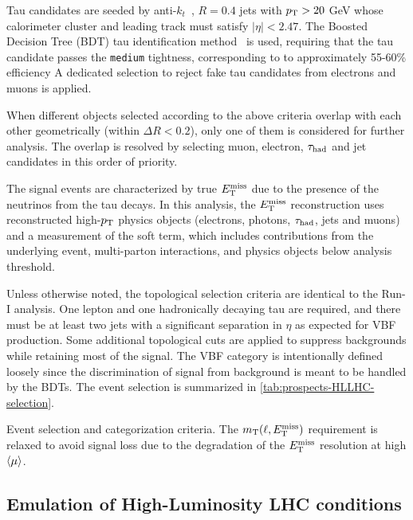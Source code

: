 Tau candidates are seeded by anti-$k_t$~\cite{2008.antikt}, $R=0.4$ jets with $p_{\mathrm{T}} > 20$ GeV whose calorimeter cluster and leading track must satisfy $|\eta| < 2.47$. The Boosted Decision Tree (BDT) tau identification method~\cite{PERF-2013-06} is used, requiring that the tau candidate passes the \texttt{medium} tightness, corresponding to to approximately 55-60\% efficiency A dedicated selection to reject fake tau candidates from electrons and muons is applied.

When different objects selected according to the above criteria overlap with each other geometrically (within $\Delta R < 0.2$), only one of them is considered for further analysis. The overlap is resolved by selecting muon, electron, $\tau_\text{had}$ and jet candidates in this order of priority.

The signal events are characterized by true $E_{\mathrm{T}}^{\mathrm{miss}}$ due to the presence of the neutrinos from the tau decays. In this analysis, the $E_{\mathrm{T}}^{\mathrm{miss}}$ reconstruction uses reconstructed high-$p_{\mathrm{T}}$ physics objects (electrons, photons, $\tau_\text{had}$, jets and muons) and a measurement of the soft term, which includes contributions from the underlying event, multi-parton interactions, and physics objects below analysis threshold.

Unless otherwise noted, the topological selection criteria are identical to the Run-I analysis. One lepton and one hadronically decaying tau are required, and there must be at least two jets with a significant separation in $\eta$ as expected for VBF production. Some additional topological cuts are applied to suppress backgrounds while retaining most of the signal. The VBF category is intentionally defined loosely since the discrimination of signal from background is meant to be handled by the BDTs. The event selection is summarized in \cref{tab:prospects-HLLHC-selection}.

\begin{table}[bp]
  \centering
  \renewcommand{\arraystretch}{1.4}
  \caption{Event selection and categorization criteria. The $m_\text{T}(\ell, E_{\mathrm{T}}^{\mathrm{miss}})$ requirement is relaxed to avoid signal loss due to the degradation of the $E_{\mathrm{T}}^{\mathrm{miss}}$ resolution at high $\langle\mu\rangle$.}
  
  \label{tab:prospects-HLLHC-selection}
\end{table}

\subsection{Emulation of High-Luminosity LHC conditions}

